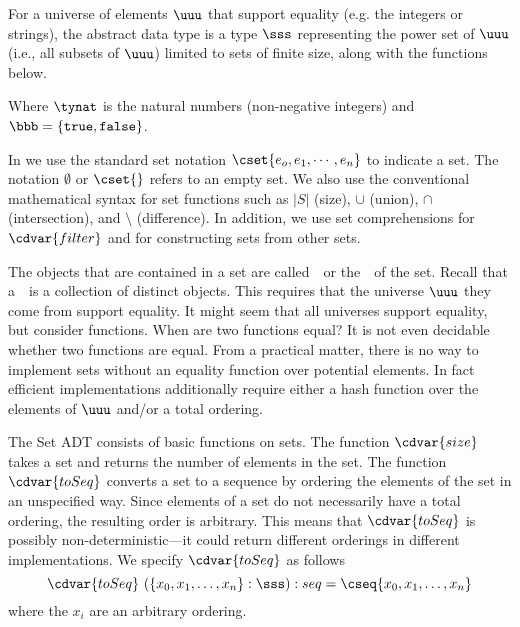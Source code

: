 \begin{datatype}[Sets]

\label{XXadt:sets} 

For a universe of elements $\uuu$ that support equality (e.g. the integers or strings), the 
 abstract data type is a type $\sss$ representing the power 
set of $\uuu$ (i.e., all subsets of $\uuu$) limited to sets of finite 
size, along with the functions below. 
{\normalsize

}
Where $\tynat$ is 
the natural numbers (non-negative integers) and $\bbb = \{\texttt{true},
\texttt{false}\}$.
\end{datatype}

\begin{syntax}[Sets] 
\label{XXsyn:sets}
In \pml{}  we use the standard set notation $\cset{e_o,e_1,\cdots,e_n}$ to
  indicate a set.  The notation $\emptyset$ or $\cset{}$ refers to an
  empty set. We also use the conventional mathematical syntax for set
  functions such as $|S|$ (size), $\cup$ (union), $\cap$
  (intersection), and $\setminus$ (difference).  In addition, we use
  set comprehensions for $\cdvar{filter}$ and for constructing sets from
  other sets.
\end{syntax}

\begin{gram}
  The objects that are contained in a set are called~~or the~~of the set.  Recall that a~~is a collection of distinct objects.  This requires that
  the universe $\uuu$ they come from support equality.  It might seem that
  all universes support equality, but consider functions.  When are
  two functions equal?   It is not even decidable whether two
  functions are equal.   From a practical matter, there is no way to
  implement sets without an equality function over potential
  elements.   In fact efficient implementations additionally require
  either a hash function over the elements of $\uuu$ and/or a total ordering.
\end{gram}

\begin{gram}
The Set ADT consists of basic functions on sets.  
%
The function $\cdvar{size}$ takes a set and returns the number of elements
in the set.
% 
The function $\cdvar{toSeq}$ converts a set to a sequence by ordering the
elements of the set in an unspecified way. 
%
Since elements of a set do not necessarily have a total ordering, the
resulting order is arbitrary.
%
This means that $\cdvar{toSeq}$ is possibly non-deterministic---it could
return different orderings in different implementations.
%
We specify $\cdvar{toSeq}$ as follows
\[
\cdvar{toSeq}~(\{x_0,x_1,\ldots,x_n\} : \sss): seq = \cseq{x_0,x_1,\ldots,x_n}
\]
where the $x_i$ are an arbitrary ordering. 
\end{gram}


